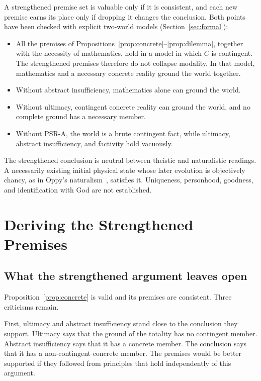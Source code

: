 \documentclass[11pt,letterpaper]{article}
\theoremstyle{plain}
\theoremstyle{definition}
\begin{document}
A strengthened premise set is valuable only if it is consistent, and each new premise earns its place only if dropping it changes the conclusion. Both points have been checked with explicit two-world models (Section~\ref{sec:formal}):
\begin{itemize}
  \item All the premises of Propositions~\ref{prop:concrete}--\ref{prop:dilemma}, together with the necessity of mathematics, hold in a model in which $C$ is contingent. The strengthened premises therefore do not collapse modality. In that model, mathematics and a necessary concrete reality ground the world together.
  \item Without abstract insufficiency, mathematics alone can ground the world.
  \item Without ultimacy, contingent concrete reality can ground the world, and no complete ground has a necessary member.
  \item Without PSR-A, the world is a brute contingent fact, while ultimacy, abstract insufficiency, and factivity hold vacuously.
\end{itemize}
The strengthened conclusion is neutral between theistic and naturalistic readings. A necessarily existing initial physical state whose later evolution is objectively chancy, as in Oppy's naturalism~\cite{oppy13}, satisfies it. Uniqueness, personhood, goodness, and identification with God are not established.

\clearpage
\section{Deriving the Strengthened Premises}
\label{sec:derived}

\subsection{What the strengthened argument leaves open}
\label{sec:open}

Proposition~\ref{prop:concrete} is valid and its premises are consistent. Three criticisms remain.

First, ultimacy and abstract insufficiency stand close to the conclusion they support. Ultimacy says that the ground of the totality has no contingent member. Abstract insufficiency says that it has a concrete member. The conclusion says that it has a non-contingent concrete member. The premises would be better supported if they followed from principles that hold independently of this argument.
\end{document}
